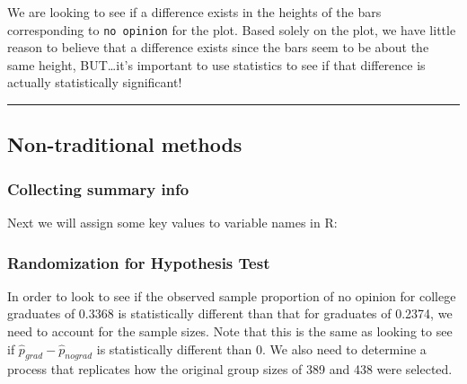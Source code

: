 \documentclass[]{tufte-book}
\newenvironment{Shaded}{\begin{snugshade}}{\end{snugshade}}
\newcommand{\DecValTok}[1]{\textcolor[rgb]{0.00,0.00,0.81}{{#1}}}
\newcommand{\StringTok}[1]{\textcolor[rgb]{0.31,0.60,0.02}{{#1}}}
\newcommand{\NormalTok}[1]{{#1}}
\let\oldrule=\rule
\renewcommand{\rule}[1]{\oldrule{\linewidth}}
\begin{document}
We are looking to see if a difference exists in the heights of the bars
corresponding to \texttt{no\ opinion} for the plot. Based solely on the
plot, we have little reason to believe that a difference exists since
the bars seem to be about the same height, BUT\ldots{}it's important to
use statistics to see if that difference is actually statistically
significant!

\begin{center}\rule{0.5\linewidth}{\linethickness}\end{center}

\subsection{Non-traditional methods}\label{non-traditional-methods-2}

\subsubsection{Collecting summary info}\label{collecting-summary-info}

Next we will assign some key values to variable names in R:

\begin{Shaded}
\end{Shaded}

\subsubsection{Randomization for Hypothesis
Test}\label{randomization-for-hypothesis-test}

In order to look to see if the observed sample proportion of no opinion
for college graduates of 0.3368 is statistically different than that for
graduates of 0.2374, we need to account for the sample sizes. Note that
this is the same as looking to see if
\(\hat{p}_{grad} - \hat{p}_{nograd}\) is statistically different than 0.
We also need to determine a process that replicates how the original
group sizes of 389 and 438 were selected.
\end{document}
